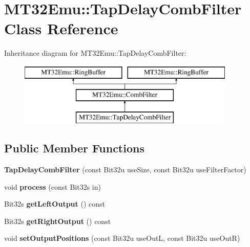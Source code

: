 \hypertarget{classMT32Emu_1_1TapDelayCombFilter}{\section{M\-T32\-Emu\-:\-:Tap\-Delay\-Comb\-Filter Class Reference}
\label{classMT32Emu_1_1TapDelayCombFilter}
}
Inheritance diagram for M\-T32\-Emu\-:\-:Tap\-Delay\-Comb\-Filter\-:\begin{figure}[H]
\begin{center}
\leavevmode
\includegraphics[height=3.000000cm]{classMT32Emu_1_1TapDelayCombFilter}
\end{center}
\end{figure}
\subsection*{Public Member Functions}
\begin{DoxyCompactItemize}
\item 
\hypertarget{classMT32Emu_1_1TapDelayCombFilter_a06244d9c2ddcd2e2a7beae0b03de49d6}{{\bfseries Tap\-Delay\-Comb\-Filter} (const Bit32u use\-Size, const Bit32u use\-Filter\-Factor)}\label{classMT32Emu_1_1TapDelayCombFilter_a06244d9c2ddcd2e2a7beae0b03de49d6}

\item 
\hypertarget{classMT32Emu_1_1TapDelayCombFilter_ac92f2b5c2c5d5f0d430f5303b56897d3}{void {\bfseries process} (const Bit32s in)}\label{classMT32Emu_1_1TapDelayCombFilter_ac92f2b5c2c5d5f0d430f5303b56897d3}

\item 
\hypertarget{classMT32Emu_1_1TapDelayCombFilter_aa1435eb840308eb5f9296e839a53fd55}{Bit32s {\bfseries get\-Left\-Output} () const }\label{classMT32Emu_1_1TapDelayCombFilter_aa1435eb840308eb5f9296e839a53fd55}

\item 
\hypertarget{classMT32Emu_1_1TapDelayCombFilter_a0aa54932b66ca263e1b91cc02f0d64e3}{Bit32s {\bfseries get\-Right\-Output} () const }\label{classMT32Emu_1_1TapDelayCombFilter_a0aa54932b66ca263e1b91cc02f0d64e3}

\item 
\hypertarget{classMT32Emu_1_1TapDelayCombFilter_a9eaa857aba7b38aa62b43cdc1faff070}{void {\bfseries set\-Output\-Positions} (const Bit32u use\-Out\-L, const Bit32u use\-Out\-R)}\label{classMT32Emu_1_1TapDelayCombFilter_a9eaa857aba7b38aa62b43cdc1faff070}

\end{DoxyCompactItemize}


